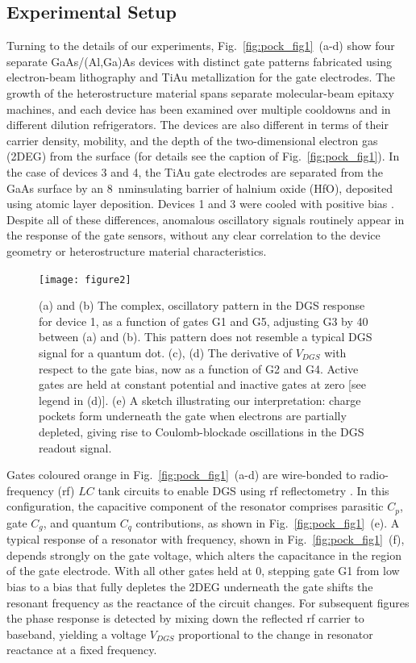 \subsection{Experimental Setup}
Turning to the details of our experiments, Fig.~\ref{fig:pock_fig1}~(a-d) show four separate GaAs/(Al,Ga)As devices with distinct gate patterns fabricated using electron-beam lithography and TiAu metallization for the gate electrodes. The growth of the heterostructure material spans separate molecular-beam epitaxy machines, and each device has been examined over multiple cooldowns and in different dilution refrigerators. The devices are also different in terms of their carrier density, mobility, and the depth of the two-dimensional electron gas (2DEG) from the surface (for details see the caption of Fig.~\ref{fig:pock_fig1}).  In the case of devices 3 and 4, the TiAu gate electrodes are separated from the GaAs surface by an \SI{8}{\nano\meter}insulating barrier of halnium oxide (HfO), deposited using atomic layer deposition. Devices 1 and 3 were cooled with positive bias \cite{PhysRevB.72.115331}. Despite all of these differences, anomalous oscillatory signals routinely appear in the response of the gate sensors, without any clear correlation to the device geometry or heterostructure material characteristics.

\begin{figure}
\texttt{[image: figure2]}
\caption[Signals of charge pockets under gates in quantum dot structures]{\label{fig:pock_fig2} (a) and (b) The complex, oscillatory pattern in the DGS response for device 1, as a function of gates G1 and G5, adjusting G3 by \SI{40}{\mv} between (a) and (b). This pattern does not resemble a typical DGS signal for a quantum dot.  (c), (d) The derivative of $V_{DGS}$ with respect to the gate bias, now as a function of G2 and G4. Active gates are held at constant potential and inactive gates at zero [see legend in (d)]. (e) A sketch illustrating our interpretation: charge pockets form underneath the gate when electrons are partially depleted, giving rise to Coulomb-blockade oscillations in the DGS readout signal.}
\end{figure}

Gates coloured orange in Fig.~\ref{fig:pock_fig1}~(a-d) are wire-bonded to radio-frequency (rf) $LC$ tank circuits to enable DGS using rf reflectometry \cite{Colless_PRL,doi:10.1063/1.4868107}. In this configuration, the capacitive component of the resonator comprises parasitic $C_p$, gate $C_g$, and quantum $C_q$ contributions, as shown in Fig.~\ref{fig:pock_fig1}~(e). A typical response of a resonator with frequency, shown in Fig.~\ref{fig:pock_fig1}~(f), depends strongly on the gate voltage, which alters the capacitance in the region of the gate electrode. With all other gates held at \SI{0}{\mv}, stepping gate G1 from low bias to a bias that fully depletes the 2DEG underneath the gate  shifts the resonant frequency as the reactance of the circuit changes. For subsequent figures the phase response is detected by mixing down the reflected rf carrier to baseband, yielding a voltage $V_{DGS}$ proportional to the change in resonator reactance at a fixed frequency.


